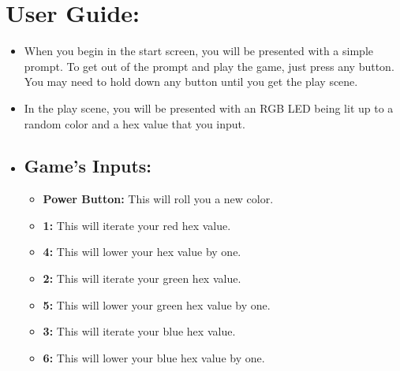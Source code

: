 \documentclass[12pt]{article}
\begin{document}
\section{User Guide:}
\begin{itemize}
  \item When you begin in the start screen, you will be presented with a
    simple prompt. To get out of the prompt and play the game, just press any button.
    You may need to hold down any button until you get the play scene.
  \item In the play scene, you will be presented with an RGB LED being lit up
    to a random color and a hex value that you input.
    \item\subsection*{Game's Inputs:}
\begin{minipage}{0.7\textwidth}
    \begin{itemize}
        \item \textbf{Power Button:} This will roll you a new color.
        \item \textbf{1:} This will iterate your red hex value.
        \item \textbf{4:} This will lower your hex value by one.
        \item \textbf{2:} This will iterate your green hex value.
        \item \textbf{5:} This will lower your green hex value by one.
        \item \textbf{3:} This will iterate your blue hex value.
        \item \textbf{6:} This will lower your blue hex value by one.
    \end{itemize}
\end{minipage}%
\hfill
\begin{minipage}{0.28\textwidth}
    \centering

\end{minipage}
\end{itemize}
\end{document}
